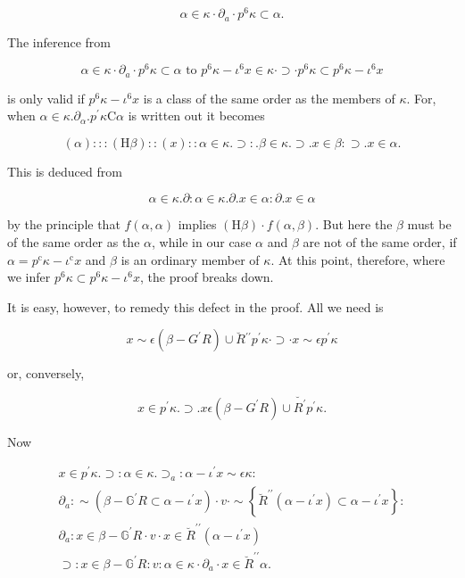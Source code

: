 \documentclass[10pt]{article}
\begin{document}
$$
\alpha \in \kappa \cdot \partial_{a} \cdot p^{6} \kappa \subset \alpha .
$$

The inference from

$$
\alpha \in \kappa \cdot \partial_{a} \cdot p^{6} \kappa \subset \alpha \text { to } p^{6} \kappa-\iota^{6} x \in \kappa \cdot \supset \cdot p^{6} \kappa \subset p^{6} \kappa-\iota^{6} x
$$

is only valid if $p^{6} \kappa-\iota^{6} x$ is a class of the same order as the members of $\kappa$. For, when $\alpha \in \kappa . \partial_{\alpha} . p^{\prime} \kappa \mathrm{C} \alpha$ is written out it becomes

$$
(\alpha):::(\mathrm{H} \beta)::(x):: \alpha \in \kappa . \supset: . \beta \in \kappa . \supset . x \in \beta: \supset . x \in \alpha .
$$

This is deduced from

$$
\alpha \in \kappa . \partial: \alpha \in \kappa . \partial . x \in \alpha: \partial . x \in \alpha
$$

by the principle that $f(\alpha, \alpha)$ implies $(\mathrm{H} \beta) \cdot f(\alpha, \beta)$. But here the $\beta$ must be of the same order as the $\alpha$, while in our case $\alpha$ and $\beta$ are not of the same order, if $\alpha=p^{\mathrm{c}} \kappa-\iota^{\mathrm{c}} x$ and $\beta$ is an ordinary member of $\kappa$. At this point, therefore, where we infer $p^{6} \kappa \subset p^{6} \kappa-\iota^{6} x$, the proof breaks down.

It is easy, however, to remedy this defect in the proof. All we need is

$$
x \sim \epsilon\left(\beta-G^{\prime} R\right) \cup \breve{R}{ }^{\prime \prime} p^{\prime} \kappa \cdot \supset \cdot x \sim \epsilon p^{\prime} \kappa
$$

or, conversely,

$$
x \in p^{\prime} \kappa . \supset . x \epsilon\left(\beta-G^{\prime} R\right) \cup \breve{R^{\prime}} p^{\prime} \kappa .
$$

Now

$$
\begin{gathered}
x \in p^{\prime} \kappa . \supset: \alpha \in \kappa . \supset_{a}: \alpha-\iota^{\prime} x \sim \epsilon \kappa: \\
\partial_{a}: \sim\left(\beta-\mathbb{G}^{\prime} R \subset \alpha-\iota^{\prime} x\right) \cdot v \cdot \sim\left\{\breve{R}^{\prime \prime}\left(\alpha-\iota^{\prime} x\right) \subset \alpha-\iota^{\prime} x\right\}: \\
\partial_{a}: x \in \beta-\mathbb{G}^{\prime} R \cdot v \cdot x \in \breve{R}^{\prime \prime}\left(\alpha-\iota^{\prime} x\right) \\
\supset: x \in \beta-\mathbb{G}^{\prime} R: v: \alpha \in \kappa \cdot \partial_{a} \cdot x \in \breve{R}^{\prime \prime} \alpha .
\end{gathered}
$$
\end{document}
